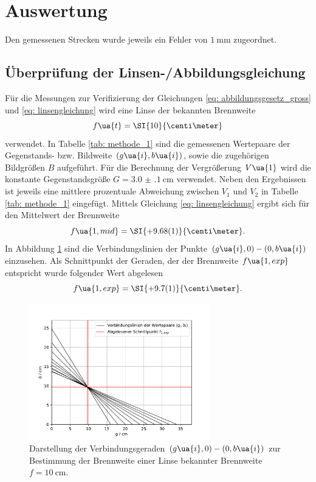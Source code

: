 \section{Auswertung}

Den gemessenen Strecken wurde jeweils ein Fehler von $\SI{1}{\milli\meter}$ zugeordnet. %

\subsection{Überprüfung der Linsen-/Abbildungsgleichung}
Für die Messungen zur Verifizierung der Gleichungen \eqref{eq: abbildungsgesetz_gross} und \eqref{eq: linsengleichung} wird eine Linse
der bekannten Brennweite
\begin{equation}
  f\ua{t} = \SI{10}{\centi\meter}
\end{equation}
verwendet. In Tabelle \ref{tab: methode_1} sind die gemessenen Wertepaare der Gegenstands- bzw. Bildweite $(g\ua{i}, b\ua{i})$,
sowie die zugehörigen Bildgrößen $B$ aufgeführt. Für die Berechnung der Vergrößerung $V\ua{1}$
wird die konstante Gegenstandsgröße $G = \SI{3.0(1)}{\centi\meter}$ verwendet. Neben den Ergebnissen ist jeweils
eine mittlere prozentuale Abweichung zwischen $V_1$ und $V_2$ in Tabelle \ref{tab: methode_1} eingefügt.
Mittels Gleichung \eqref{eq: linsengleichung} ergibt sich für den Mittelwert der Brennweite
\begin{equation}
  f\ua{1, mid} = \SI{+9.68(1)}{\centi\meter}.
\end{equation}
In Abbildung \ref{fig: methode_1} sind die Verbindungslinien der Punkte $(g\ua{i}, 0)-(0, b\ua{i})$ einzusehen. Als Schnittpunkt
der Geraden, der der Brennweite $f\ua{1, exp}$ entspricht wurde folgender Wert abgelesen
\begin{equation}
  f\ua{1, exp} = \SI{+9.7(1)}{\centi\meter}.
\end{equation}
\begin{figure}
  \centering
  \includegraphics[width=0.7\textwidth]{../Messdaten/plots/methode_1.pdf}
  \caption{Darstellung der Verbindungsgeraden $(g\ua{i}, 0) - (0, b\ua{i})$ zur Bestimmung der Brennweite einer
  Linse bekannter Brennweite $f = \SI{10}{\centi\meter}$.}
  \label{fig: methode_1}
\end{figure}


